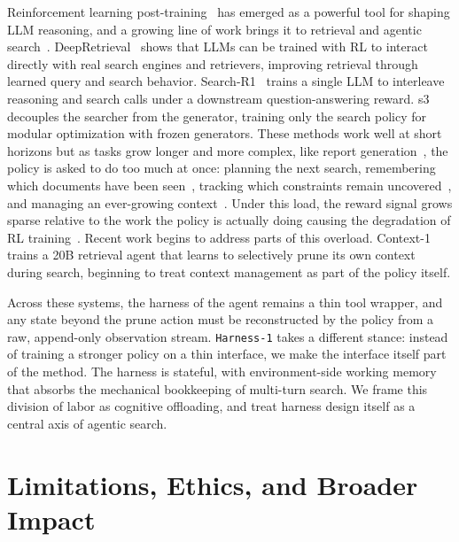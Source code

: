 \documentclass{article}
\newcommand{\sys}{\texttt{Harness-1}\xspace}
\begin{document}
Reinforcement learning post-training~\citep{schulman2017proximalpolicyoptimizationalgorithms, hu2025reinforce++, yu2025dapo, Guo_2025} has emerged as a powerful tool for shaping LLM reasoning, and a growing line of work brings it to retrieval and agentic search~\citep{song2025r1, chen2025researchlearningreasonsearch, jiang2025deepretrieval, zheng-etal-2025-deepresearcher}. DeepRetrieval~\citep{jiang2025deepretrieval} shows that LLMs can be trained with RL to interact directly with real search engines and retrievers, improving retrieval through learned query and search behavior. Search-R1~\citep{jin2025searchr1} trains a single LLM to interleave reasoning and search calls under a downstream question-answering reward. s3~\citep{jiang2025s3} decouples the searcher from the generator, training only the search policy for modular optimization with frozen generators. These methods work well at short horizons but as tasks grow longer and more complex, like report generation~\citep{wu2025webdancer, li2025websailor}, the policy is asked to do too much at once: planning the next search\citep{chen2026apexsearcheraugmentingllmssearch, sun2025decouplesearch}, remembering which documents have been seen~\citep{zhou2025mem1, packer2024memgpt}, tracking which constraints remain uncovered~\citep{chen2025browsecompplus}, and managing an ever-growing context~\citep{hong2025context}. Under this load, the reward signal grows sparse relative to the work the policy is actually doing causing the degradation of RL training~\citep{deng2025atom, wang2025spa}. Recent work begins to address parts of this overload. Context-1~\citep{bashir2026context1} trains a 20B retrieval agent that learns to selectively prune its own context during search, beginning to treat context management as part of the policy itself.

Across these systems, the harness of the agent remains a thin tool wrapper, and any state beyond 
the prune action must be reconstructed by the policy 
from a raw, append-only observation stream. 
\sys takes a different stance: instead of training a stronger 
policy on a thin interface, we make the interface itself part of the 
method. 
The harness is stateful, with environment-side working memory 
that absorbs the mechanical bookkeeping of multi-turn search. We frame this division of labor as 
cognitive offloading, and treat harness design itself as a central axis of agentic search.

\section{Limitations, Ethics, and Broader Impact}
\label{sec:limitations-ethics-impact}
\end{document}
